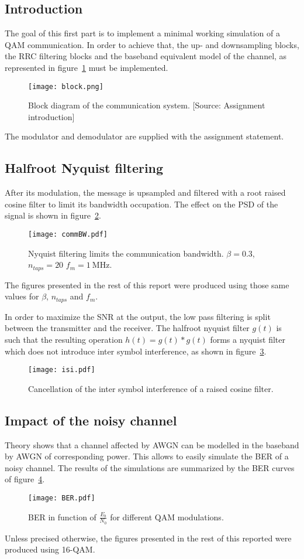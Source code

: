 \subsection{Introduction}
The goal of this first part is to implement a minimal working simulation of a QAM communication.
In order to achieve that, the up- and downsampling blocks, the RRC filtering blocks and the baseband equivalent model of the channel, as represented in figure~\ref{fig:chain} must be implemented.
\begin{figure}[htbp]
\centering
\texttt{[image: block.png]}
\caption[Block diagram of the communication system.]{Block diagram of the communication system. [Source: Assignment introduction]\label{fig:chain}}
\end{figure}
The modulator and demodulator are supplied with the assignment statement.

\subsection{Halfroot Nyquist filtering}
After its modulation, the message is upsampled and filtered with a root raised cosine filter to limit its bandwidth occupation.
The effect on the PSD of the signal is shown in figure~\ref{fig:LPF}.
\begin{figure}[htbp]
\centering
\texttt{[image: commBW.pdf]}
\caption[Nyquist filtering limits the communication bandwidth.]{Nyquist filtering limits the communication bandwidth. $\beta = 0.3$, $n_{taps} = 20$ $f_m = \SI{1}{\mega\hertz}.$ \label{fig:LPF}}
\end{figure}
The figures presented in the rest of this report were produced using those same values for $\beta$, $n_{taps}$ and $f_m$.

In order to maximize the SNR at the output, the low pass filtering is split between the transmitter and the receiver.
The halfroot nyquist filter $g(t)$ is such that the resulting operation $h(t) = g(t)*g(t)$ forms a nyquist filter which does not introduce inter symbol interference, as shown in figure~\ref{fig:noISI}.
\begin{figure}
\centering
\texttt{[image: isi.pdf]}
\caption{Cancellation of the inter symbol interference of a raised cosine filter.\label{fig:noISI}}
\end{figure}

\subsection{Impact of the noisy channel}
Theory shows that a channel affected by AWGN can be modelled in the baseband by AWGN of corresponding power.
This allows to easily simulate the BER of a noisy channel.
The results of the simulations are summarized by the BER curves of figure~\ref{fig:BER}.
\begin{figure}[htbp]
\texttt{[image: BER.pdf]}
\caption{BER in function of $\frac{E_b}{N_0}$ for different QAM modulations.\label{fig:BER}}
\end{figure}
Unless precised otherwise, the figures presented in the rest of this reported were produced using 16-QAM.

